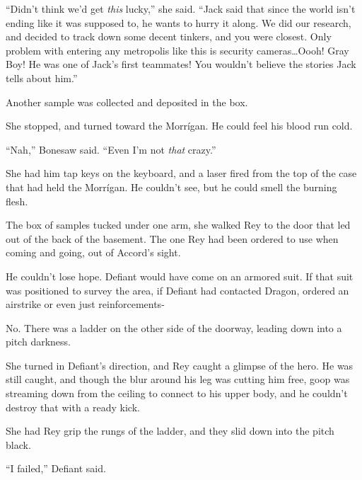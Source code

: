 ``Didn't think we'd get \emph{this} lucky,'' she said.  ``Jack said that since the world isn't ending like it was supposed to, he wants to hurry it along.  We did our research, and decided to track down some decent tinkers, and you were closest.  Only problem with entering any metropolis like this is security cameras\ldots Oooh!  Gray Boy!  He was one of Jack's first teammates!  You wouldn't believe the stories Jack tells about him.''



Another sample was collected and deposited in the box.



She stopped, and turned toward the Morr\'{i}gan.  He could feel his blood run cold.



``Nah,'' Bonesaw said.  ``Even I'm not \emph{that} crazy.''



She had him tap keys on the keyboard, and a laser fired from the top of the case that had held the Morr\'{i}gan.  He couldn't see, but he could smell the burning flesh.



The box of samples tucked under one arm, she walked Rey to the door that led out of the back of the basement.  The one Rey had been ordered to use when coming and going, out of Accord's sight.



He couldn't lose hope.  Defiant would have come on an armored suit.  If that suit was positioned to survey the area, if Defiant had contacted Dragon, ordered an airstrike or even just reinforcements-



No.  There was a ladder on the other side of the doorway, leading down into a pitch darkness.



She turned in Defiant's direction, and Rey caught a glimpse of the hero.  He was still caught, and though the blur around his leg was cutting him free, goop was streaming down from the ceiling to connect to his upper body, and he couldn't destroy that with a ready kick.



She had Rey grip the rungs of the ladder, and they slid down into the pitch black.



\sectionbreak



``I failed,'' Defiant said.



